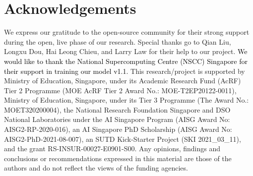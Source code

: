 \documentclass{article}
\begin{document}
\section*{Acknowledgements}
We express our gratitude to the open-source community for their strong support during the open, live phase of our research. Special thanks go to Qian Liu, Longxu Dou, Hai Leong Chieu, and Larry Law for their help to our project.
%
\textcolor{black}{We would like to thank the National Supercomputing Centre (NSCC) Singapore for their support in training our model v1.1.}
%
This research/project is supported by Ministry of Education, Singapore, under its Academic Research Fund (AcRF) Tier 2 Programme (MOE AcRF Tier 2 Award No.: MOE-T2EP20122-0011), Ministry of Education, Singapore, under its Tier 3 Programme (The Award No.: MOET320200004), the National Research Foundation Singapore and DSO National Laboratories under the AI Singapore Program (AISG Award No: AISG2-RP-2020-016), an AI Singapore PhD Scholarship (AISG Award No: AISG2-PhD-2021-08-007), an SUTD Kick-Starter Project (SKI 2021\_03\_11), and the grant RS-INSUR-00027-E0901-S00. Any opinions, findings and conclusions or recommendations expressed in this material are those of the authors and do not reflect the views of the funding agencies.





\appendix


\end{document}
